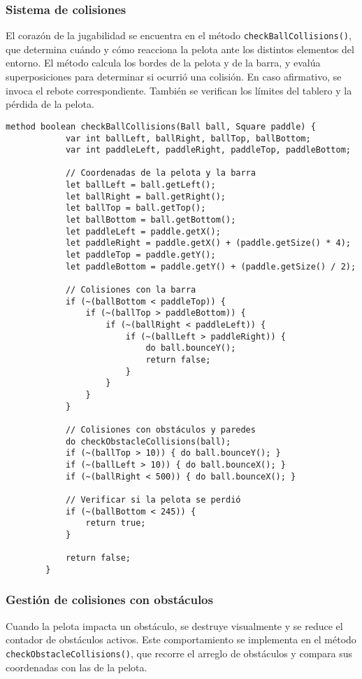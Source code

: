 \documentclass[twocolumn]{article}
\begin{document}
	\subsubsection{Sistema de colisiones}
	El corazón de la jugabilidad se encuentra en el método \texttt{checkBallCollisions()}, que determina cuándo y cómo reacciona la pelota ante los distintos elementos del entorno.  
	El método calcula los bordes de la pelota y de la barra, y evalúa superposiciones para determinar si ocurrió una colisión. En caso afirmativo, se invoca el rebote correspondiente. También se verifican los límites del tablero y la pérdida de la pelota.
	
	\begin{lstlisting}[caption=Verificación de colisiones principales]
		method boolean checkBallCollisions(Ball ball, Square paddle) {
			var int ballLeft, ballRight, ballTop, ballBottom;
			var int paddleLeft, paddleRight, paddleTop, paddleBottom;
			
			// Coordenadas de la pelota y la barra
			let ballLeft = ball.getLeft();
			let ballRight = ball.getRight();
			let ballTop = ball.getTop();
			let ballBottom = ball.getBottom();
			let paddleLeft = paddle.getX();
			let paddleRight = paddle.getX() + (paddle.getSize() * 4);
			let paddleTop = paddle.getY();
			let paddleBottom = paddle.getY() + (paddle.getSize() / 2);
			
			// Colisiones con la barra
			if (~(ballBottom < paddleTop)) {
				if (~(ballTop > paddleBottom)) {
					if (~(ballRight < paddleLeft)) {
						if (~(ballLeft > paddleRight)) {
							do ball.bounceY();
							return false;
						}
					}
				}
			}
			
			// Colisiones con obstáculos y paredes
			do checkObstacleCollisions(ball);
			if (~(ballTop > 10)) { do ball.bounceY(); }
			if (~(ballLeft > 10)) { do ball.bounceX(); }
			if (~(ballRight < 500)) { do ball.bounceX(); }
			
			// Verificar si la pelota se perdió
			if (~(ballBottom < 245)) {
				return true;
			}
			
			return false;
		}
	\end{lstlisting}
	
	\subsubsection{Gestión de colisiones con obstáculos}
	Cuando la pelota impacta un obstáculo, se destruye visualmente y se reduce el contador de obstáculos activos. Este comportamiento se implementa en el método \texttt{checkObstacleCollisions()}, que recorre el arreglo de obstáculos y compara sus coordenadas con las de la pelota.
	
\end{document}
